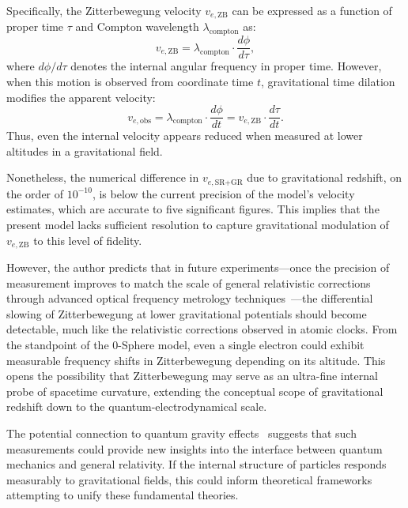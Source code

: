 \documentclass[%
 reprint,
 amsmath,amssymb,
 aps,
]{revtex4-1}
\numberwithin{equation}{section}%
\begin{document}
Specifically, the Zitterbewegung velocity $v_{e,\text{ZB}}$ can be expressed as a function of proper time $\tau$ and Compton wavelength $\lambda_{\text{compton}}$ as:
\begin{equation}
v_{e,\text{ZB}} = \lambda_{\text{compton}} \cdot \frac{d\phi}{d\tau},
\end{equation}
where $d\phi/d\tau$ denotes the internal angular frequency in proper time. However, when this motion is observed from coordinate time $t$, gravitational time dilation modifies the apparent velocity:
\begin{equation}
v_{e,\text{obs}} = \lambda_{\text{compton}} \cdot \frac{d\phi}{dt} = v_{e,\text{ZB}} \cdot \frac{d\tau}{dt}.
\end{equation}
Thus, even the internal velocity appears reduced when measured at lower altitudes in a gravitational field.

Nonetheless, the numerical difference in $v_{e,\text{SR+GR}}$ due to gravitational redshift, on the order of $10^{-10}$, is below the current precision of the model's velocity estimates, which are accurate to five significant figures. This implies that the present model lacks sufficient resolution to capture gravitational modulation of $v_{e,\text{ZB}}$ to this level of fidelity. 

However, the author predicts that in future experiments—once the precision of measurement improves to match the scale of general relativistic corrections through advanced optical frequency metrology techniques~\cite{udem2002}—the differential slowing of Zitterbewegung at lower gravitational potentials should become detectable, much like the relativistic corrections observed in atomic clocks. From the standpoint of the 0-Sphere model, even a single electron could exhibit measurable frequency shifts in Zitterbewegung depending on its altitude. This opens the possibility that Zitterbewegung may serve as an ultra-fine internal probe of spacetime curvature, extending the conceptual scope of gravitational redshift down to the quantum-electrodynamical scale.

The potential connection to quantum gravity effects~\cite{colella1975} suggests that such measurements could provide new insights into the interface between quantum mechanics and general relativity. If the internal structure of particles responds measurably to gravitational fields, this could inform theoretical frameworks attempting to unify these fundamental theories.


\end{document}
